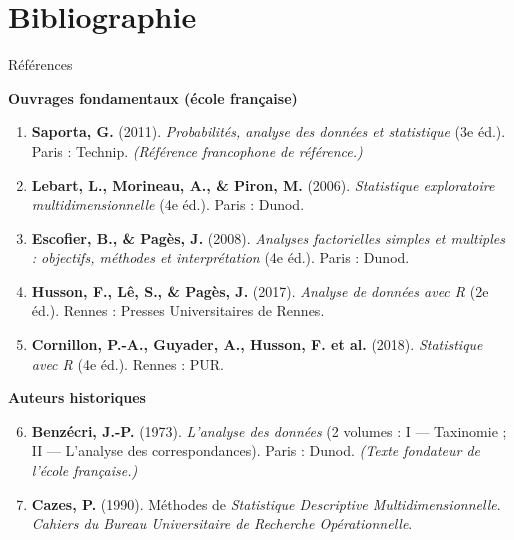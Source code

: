 \section*{Bibliographie}

\begin{frame}[allowframebreaks]{Références}

\textbf{\large Ouvrages fondamentaux (école française)}\\[6pt]

\begin{enumerate}
  \item \textbf{Saporta, G.} (2011).
        \textit{Probabilités, analyse des données et statistique} (3e éd.).
        Paris : Technip. \emph{(Référence francophone de référence.)}

  \item \textbf{Lebart, L., Morineau, A., \& Piron, M.} (2006).
        \textit{Statistique exploratoire multidimensionnelle} (4e éd.).
        Paris : Dunod.

  \item \textbf{Escofier, B., \& Pagès, J.} (2008).
        \textit{Analyses factorielles simples et multiples : objectifs,
        méthodes et interprétation} (4e éd.). Paris : Dunod.

  \item \textbf{Husson, F., Lê, S., \& Pagès, J.} (2017).
        \textit{Analyse de données avec R} (2e éd.).
        Rennes : Presses Universitaires de Rennes.

  \item \textbf{Cornillon, P.-A., Guyader, A., Husson, F. et al.} (2018).
        \textit{Statistique avec R} (4e éd.). Rennes : PUR.
\end{enumerate}

\framebreak

\textbf{\large Auteurs historiques}\\[6pt]

\begin{enumerate}
  \setcounter{enumi}{5}
  \item \textbf{Benzécri, J.-P.} (1973).
        \textit{L'analyse des données} (2 volumes : I — Taxinomie ;
        II — L'analyse des correspondances). Paris : Dunod.
        \emph{(Texte fondateur de l'école française.)}

  \item \textbf{Cazes, P.} (1990).
        Méthodes de \textit{Statistique Descriptive Multidimensionnelle}.
        \textit{Cahiers du Bureau Universitaire de Recherche Opérationnelle}.


\end{enumerate}
\end{frame}
